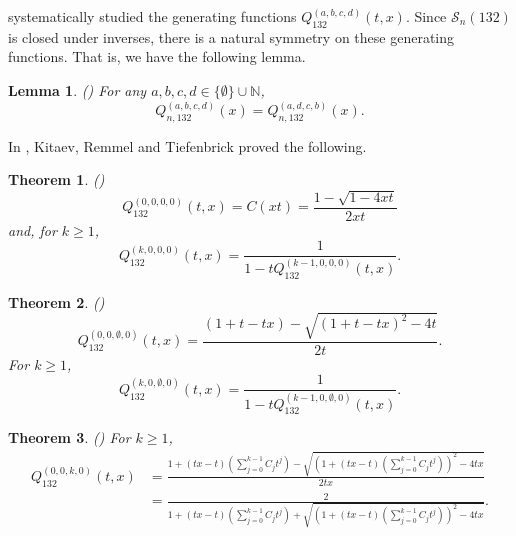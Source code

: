 \documentclass[
final,nomarks
]{dmtcs-episciences}
\newtheorem{theorem}{Theorem}
\newtheorem{lemma}{Lemma}
\newcommand{\Sn}[1]{\mathcal{S}_{#1}}
\begin{document}
\cite{KRT1,KRT2,KRT3} systematically studied the generating functions 
\begin{math}Q_{132}^{(a,b,c,d)}(t,x)\end{math}.   Since \begin{math}\Sn{n}(132)\end{math} is closed under inverses, there 
is a natural symmetry on these generating functions. That is, we have the following 
lemma. 
\begin{lemma}\label{sym}  (\cite{KRT1})
	For any \begin{math}a,b,c,d \in \{\emptyset\} \cup \mathbb{N}\end{math}, 
	\begin{equation}
	Q_{n,132}^{(a,b,c,d)}(x) = Q_{n,132}^{(a,d,c,b)}(x). 
	\end{equation}
\end{lemma}

In \cite{KRT1}, Kitaev, Remmel and Tiefenbrick  proved the following. 


\begin{theorem}\label{thm:Qk000} (\cite[Theorem 4]{KRT1})
	\begin{equation}\label{eq:Q0000}
	Q_{132}^{(0,0,0,0)}(t,x) =  C(xt) = \frac{1-\sqrt{1-4xt}}{2xt}
	\end{equation}
	and, for \begin{math}k \geq 1\end{math}, 
	\begin{equation}\label{Qk000}
	Q_{132}^{(k,0,0,0)}(t,x) = \frac{1}{1-tQ_{132}^{(k-1,0,0,0)}(t,x)}.
	\end{equation}
\end{theorem}


\begin{theorem}\label{thm:Qk0e0} (\cite[Theorem 15]{KRT1})
	\begin{equation}\label{00e0gf--}
	Q_{132}^{(0,0,\emptyset,0)}(t,x) = 
	\frac{(1+t-tx)-\sqrt{(1+t-tx)^2 -4t}}{2t}.
	\end{equation}
	For \begin{math}k \geq 1\end{math}, 
	\begin{equation}\label{k0e0gf}
	Q_{132}^{(k,0,\emptyset,0)}(t,x) = 
	\frac{1}{1-t Q_{132}^{(k-1,0,\emptyset,0)}(t,x)}.
	\end{equation} 
\end{theorem}

\begin{theorem}\label{thm:Q00k0} (\cite[Theorem 8]{KRT1}) 
	For \begin{math}k \geq 1\end{math}, 
	\begin{align}\label{gf00k0}
	Q_{132}^{(0,0,k,0)}(t,x)&=\frac{1+(tx-t)(\sum_{j=0}^{k-1}C_jt^j) - 
		\sqrt{(1+(tx-t)(\sum_{j=0}^{k-1}C_jt^j))^2 -4tx}}{2tx}\nonumber\\
	&=\frac{2}{1+(tx-t)(\sum_{j=0}^{k-1}C_jt^j) + \sqrt{(1+(tx-t)(\sum_{j=0}^{k-1}C_jt^j))^2 -4tx}}.
	\end{align}
\end{theorem}
\end{document}
